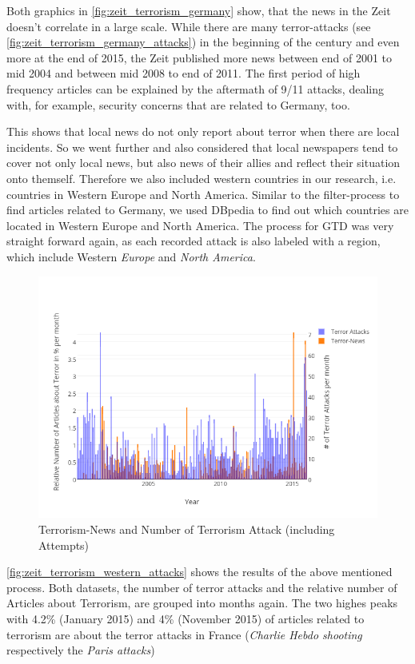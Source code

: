 Both graphics in \autoref{fig:zeit_terrorism_germany} show, that the news in the Zeit doesn't correlate in a large scale.
While there are many terror-attacks (see \autoref{fig:zeit_terrorism_germany_attacks}) in the beginning of the century and even more at the end of 2015,
the Zeit published more news between end of 2001 to mid 2004 and between mid 2008 to end of 2011.
The first period of high frequency articles can be explained by the aftermath of 9/11 attacks,
dealing with, for example, security concerns that are related to Germany, too.

This shows that local news do not only report about terror when there are local incidents.
So we went further and also considered that local newspapers tend to cover not only local news,
but also news of their allies and reflect their situation onto themself.
Therefore we also included western countries in our research, i.e. countries in Western Europe and North America.
Similar to the filter-process to find articles related to Germany,
we used DBpedia to find out which countries are located in Western Europe and North America.
The process for GTD was very straight forward again,
as each recorded attack is also labeled with a region,
which include Western \textit{Europe} and \textit{North America}.

\begin{figure}[h]
  \centering
  \includegraphics[width=.8\textwidth]{images/zeit/western_attacks}
  \caption{Terrorism-News and Number of Terrorism Attack (including Attempts)}
  \label{fig:zeit_terrorism_western_attacks}
\end{figure}
\autoref{fig:zeit_terrorism_western_attacks} shows the results of the above mentioned process.
Both datasets,
the number of terror attacks and the relative number of Articles about Terrorism,
are grouped into months again.
The two highes peaks with 4.2\% (January 2015) and 4\% (November 2015) of articles related to terrorism
are about the terror attacks in France (\textit{Charlie Hebdo shooting} respectively the \textit{Paris attacks})

